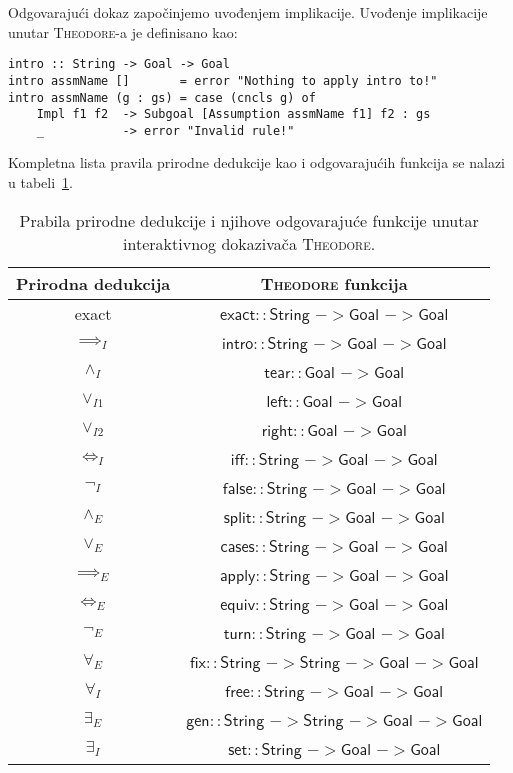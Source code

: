 \documentclass[a4paper,10pt]{article}
\theoremstyle{definition}
\begin{document}
Odgovarajući dokaz započinjemo uvođenjem implikacije. Uvođenje implikacije unutar \textsc{Theodore}-a je definisano kao:
\begin{lstlisting}
intro :: String -> Goal -> Goal
intro assmName []       = error "Nothing to apply intro to!"
intro assmName (g : gs) = case (cncls g) of
    Impl f1 f2  -> Subgoal [Assumption assmName f1] f2 : gs
    _           -> error "Invalid rule!"
\end{lstlisting}
Kompletna lista pravila prirodne dedukcije kao i odgovarajućih funkcija se nalazi u tabeli~\ref{tab:natded}.

\begin{table}[h!]
    \centering
    \begin{tabular}{c | c}
        Prirodna dedukcija & \textsc{Theodore} funkcija \\
        \hline
        exact & $\mathsf{exact :: String}$ $-> \mathsf{Goal}$ $-> \mathsf{Goal}$ \\
        $\implies_I$ & $\mathsf{intro :: String}$ $-> \mathsf{Goal}$ $-> \mathsf{Goal}$ \\
        $\land_I$ & $\mathsf{tear :: Goal}$ $-> \mathsf{Goal}$ \\
        $\lor_{I1}$ & $\mathsf{left :: Goal}$ $-> \mathsf{Goal}$ \\
        $\lor_{I2}$ & $\mathsf{right :: Goal}$ $-> \mathsf{Goal}$ \\
        $\iff_I$ & $\mathsf{iff :: String}$ $-> \mathsf{Goal}$ $-> \mathsf{Goal}$ \\
        $\neg_I$ & $\mathsf{false :: String}$ $-> \mathsf{Goal}$ $-> \mathsf{Goal}$ \\
        $\land_E$ & $\mathsf{split :: String}$ $-> \mathsf{Goal}$ $-> \mathsf{Goal}$ \\
        $\lor_E$ & $\mathsf{cases :: String}$ $-> \mathsf{Goal}$ $-> \mathsf{Goal}$ \\
        $\implies_E$ & $\mathsf{apply :: String}$ $-> \mathsf{Goal}$ $-> \mathsf{Goal}$ \\
        $\iff_E$ & $\mathsf{equiv :: String}$ $-> \mathsf{Goal}$ $-> \mathsf{Goal}$ \\
        $\neg_E$ & $\mathsf{turn :: String}$ $-> \mathsf{Goal}$ $-> \mathsf{Goal}$ \\
        $\forall_E$ & $\mathsf{fix :: String}$ $-> \mathsf{String}$ $-> \mathsf{Goal}$ $-> \mathsf{Goal}$ \\
        $\forall_I$ & $\mathsf{free :: String}$ $-> \mathsf{Goal}$ $-> \mathsf{Goal}$ \\
        $\exists_E$ & $\mathsf{gen :: String}$ $-> \mathsf{String}$ $-> \mathsf{Goal}$ $-> \mathsf{Goal}$ \\
        $\exists_I$ & $\mathsf{set:: String}$ $-> \mathsf{Goal}$ $-> \mathsf{Goal}$ \\
    \end{tabular}
    \caption{Prabila prirodne dedukcije i njihove odgovarajuće funkcije unutar interaktivnog dokazivača \textsc{Theodore}.}
    \label{tab:natded}
\end{table}
\end{document}
